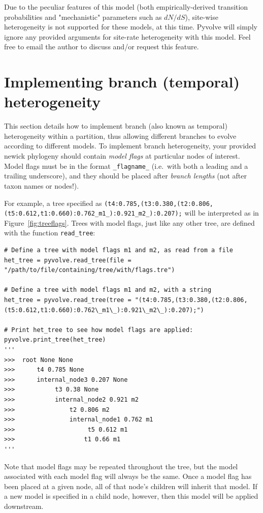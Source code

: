 \documentclass{article}
\newcommand{\code}[1]{\texttt{\small{#1}}}
\begin{document}
Due to the peculiar features of this model (both empirically-derived transition probabilities and "mechanistic" parameters such as $dN/dS$), site-wise heterogeneity is not supported for these models, at this time. Pyvolve will simply ignore any provided arguments for site-rate heterogeneity with this model. Feel free to email the author to discuss and/or request this feature.

\section{Implementing branch (temporal) heterogeneity}\label{sec:branchhet}

This section details how to implement branch (also known as temporal) heterogeneity within a partition, thus allowing different branches to evolve according to different models. To implement branch heterogeneity, your provided newick phylogeny should contain \emph{model flags} at particular nodes of interest. Model flags must be in the format \code{\_flagname\_} (i.e.\ with both a leading and a trailing underscore), and they should be placed after \emph{branch lengths} (not after taxon names or nodes!).

For example, a tree specified as  \texttt{\scriptsize{(t4:0.785,(t3:0.380,(t2:0.806,(t5:0.612,t1:0.660):0.762\_m1\_):0.921\_m2\_):0.207);}} will be interpreted as in Figure~\ref{fig:treeflags}. Trees with model flags, just like any other tree, are defined with the function \code{read\_tree}:
\begin{lstlisting}
# Define a tree with model flags m1 and m2, as read from a file
het_tree = pyvolve.read_tree(file = "/path/to/file/containing/tree/with/flags.tre")

# Define a tree with model flags m1 and m2, with a string
het_tree = pyvolve.read_tree(tree = "(t4:0.785,(t3:0.380,(t2:0.806,(t5:0.612,t1:0.660):0.762\_m1\_):0.921\_m2\_):0.207);")

# Print het_tree to see how model flags are applied:
pyvolve.print_tree(het_tree)
'''
>>>  root None None
>>>      t4 0.785 None
>>>      internal_node3 0.207 None
>>>           t3 0.38 None
>>>           internal_node2 0.921 m2
>>>               t2 0.806 m2
>>>               internal_node1 0.762 m1
>>>                    t5 0.612 m1
>>>                   t1 0.66 m1 
'''
\end{lstlisting}
Note that model flags may be repeated throughout the tree, but the model associated with each model flag will always be the same. Once a model flag has been placed at a given node, all of that node's children will inherit that model. If a new model is specified in a child node, however, then this model will be applied downstream.
\end{document}
